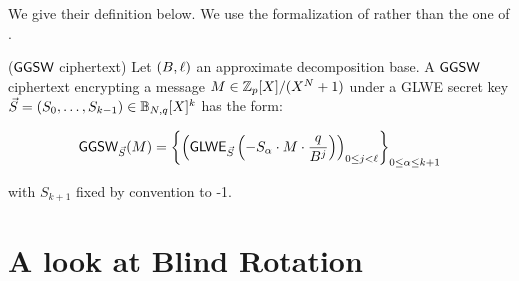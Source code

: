 We give their definition below. We use the formalization of \cite{AC:CLOT21} rather than the one of \cite{JC:CGGI20}.

\begin{definition}($\textsf{GGSW}$ ciphertext)
	Let $(B, \ell)$ an approximate decomposition base. A $\textsf{GGSW}$ ciphertext encrypting a message $M \in \mathbb{Z}_p[X] / (X^N + 1)$ under a GLWE secret key $\vec S =  (S_0, \dots, S_{k-1}) \in \mathbb{B}_{N, q}[X]^k$ has the form:
	
	\begin{equation*}
		\textsf{GGSW}_{\vec S}(M) = \left \lbrace \left ( \textsf{GLWE}_{\vec S}\left (-S_\alpha \cdot M \cdot \frac{q}{B^j} \right) \right )_{0 \le j < \ell} \right \rbrace_{0\le \alpha \le k+1}
	\end{equation*}
	
	with $S_{k+1}$ fixed by convention to -1.
\end{definition}












\section{A look at Blind Rotation}





